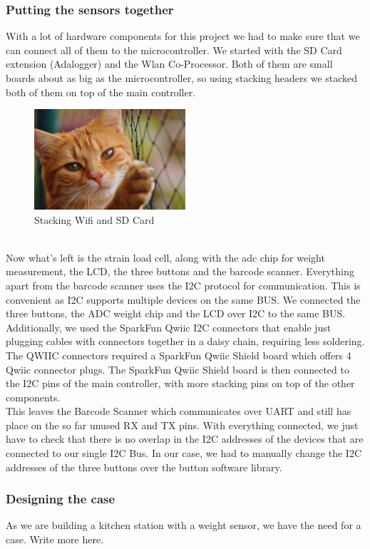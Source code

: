 \documentclass{article}
\begin{document}
\subsubsection{Putting the sensors together}
With a lot of hardware components for this project we had to make sure that we can connect all of them to the microcontroller.
We started with the SD Card extension (Adalogger) and the Wlan Co-Processor. Both of them are small boards about as big as the microcontroller, so using stacking headers we stacked both of them on top of the main controller.\\
\begin{figure}[h]
    \centering
    \includegraphics[width=0.5\textwidth]{cat.jpg}
    \caption{Stacking Wifi and SD Card}
    \label{fig:mesh1}
\end{figure}\\
Now what's left is the strain load cell, along with the adc chip for weight measurement, the LCD, the three buttons and the barcode scanner. 
Everything apart from the barcode scanner uses the I2C protocol for communication. This is convenient as I2C supports multiple devices on the same BUS.
We connected the three buttons, the ADC weight chip and the LCD over I2C to the same BUS. Additionally, we used the SparkFun Qwiic I2C connectors that enable just plugging cables with
connectors together in a daisy chain, requiring less soldering. The QWIIC connectors required a SparkFun Qwiic Shield board which offers 4 Qwiic connector plugs.
The SparkFun Qwiic Shield board is then connected to the I2C pins of the main controller, with more stacking pins on top of the other components.\\
This leaves the Barcode Scanner which communicates over UART and still has place on the so far unused RX and TX pins.
With everything connected, we just have to check that there is no overlap in the I2C addresses of the devices that are connected to our single I2C Bus.
In our case, we had to manually change the I2C addresses of the three buttons over the button software library.
\subsubsection{Designing the case}
As we are building a kitchen station with a weight sensor, we have the need for a case.
Write more here.
\end{document}
